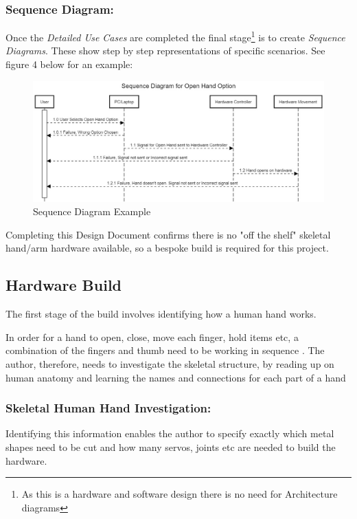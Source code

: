 \documentclass[progress]{cmpreport}
\begin{document}
\subsubsection{Sequence Diagram:}

Once the \textit{Detailed Use Cases} are completed the final stage\footnote{As this is a hardware and software design there is no need for Architecture diagrams} is to create \textit{Sequence Diagrams}. These show step by step representations of specific scenarios. See figure 4 below for an example: 

\begin{figure}[H] 
	\caption{Sequence Diagram Example }
	\centering
	\includegraphics[width=0.9 \textwidth, height=0.45 \textheight]{photos/sequence_diagram.jpg}
\end{figure}

Completing this Design Document confirms there is no "off the shelf" skeletal hand/arm hardware available, so a bespoke build is required for this project.

\subsection{Hardware Build}
The first stage of the build involves identifying how a human hand works. 

In order for a hand to open, close, move each finger, hold items etc, a combination of the fingers and thumb need to be working in sequence \citep{freivalds2011biomechanics}. The author, therefore, needs to investigate the skeletal structure, by reading up on human anatomy and learning the names and connections for each part of a hand 

\subsubsection{Skeletal Human Hand Investigation:}

Identifying this information enables the author to specify exactly which metal shapes need to be cut and how many servos, joints etc are needed to build the hardware.
\end{document}
